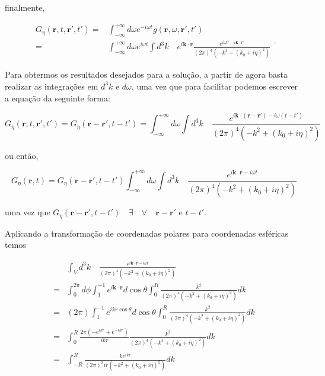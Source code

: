 finalmente,

\begin{equation}
	\begin{split}
	G_{\eta}(\textbf{r},t, \textbf{r}', t') = & 
	\int_{-\infty}^{+\infty} d\omega e^{-i\omega t} g(\textbf{r},\omega, \textbf{r}', t') \\
	= & \int_{-\infty}^{+\infty} d\omega e^{i\omega t} \int d^3k \quad e^{i\textbf{k}\cdot\textbf{r}} \frac{e^{i\omega t'-i\textbf{k}\cdot\textbf{r}'}}{(2\pi)^4\left( -k^2 + (k_0+i\eta)^2\right)}
	\end{split}.
\end{equation}

Para obtermos os resultados desejados para a solução, a partir de agora basta realizar as integrações em $d^3k$ e $d\omega$, uma vez que para facilitar podemos escrever a equação da seguinte forma:

\begin{equation}
	G_{\eta}(\textbf{r},t, \textbf{r}', t') = G_{\eta}(\textbf{r}-\textbf{r}',t-t') = \int_{-\infty}^{+\infty} d\omega \int d^3k \quad  \frac{e^{i\textbf{k}\cdot(\textbf{r}-\textbf{r}')-i\omega (t-t')}}{(2\pi)^4\left( -k^2 + (k_0+i\eta)^2\right)}
\end{equation}

ou então,

\begin{equation}
	G_{\eta}(\textbf{r},t) = G_{\eta}(\textbf{r}-\textbf{r}',t-t') \int_{-\infty}^{+\infty} d\omega \int d^3k \quad  \frac{e^{i\textbf{k}\cdot\textbf{r}-i\omega t}}{(2\pi)^4\left( -k^2 + (k_0+i\eta)^2\right)}
\end{equation}

uma vez que $G_{\eta}(\textbf{r}-\textbf{r}',t-t') \quad \exists \quad \forall \quad \textbf{r}-\textbf{r}' \text{ e } t-t'.$ 

Aplicando a transformação de coordenadas polares para coordenadas esféricas temos

\begin{equation}
	\begin{split}
	& \int_V d^3k \quad  \frac{e^{i\textbf{k}\cdot\textbf{r}-i\omega t}}{(2\pi)^4\left( -k^2 + (k_0+i\eta)^2\right)}\\
	 = &  \int_0^{2\pi}d\phi \int_{1}^{-1} e^{i\textbf{k}\cdot\textbf{r}} d\cos\theta \int_{0}^{R} \frac{k^2}{(2\pi)^4\left( -k^2 + (k_0+i\eta)^2\right)}dk \\
	 = &  (2\pi) \int_{1}^{-1} e^{ikr\cos\theta} d\cos\theta \int_{0}^{R} \frac{k^2}{(2\pi)^4\left( -k^2 + (k_0+i\eta)^2\right)}dk\\
	 = & \int_{0}^{R} \frac{2\pi \left(-e^{ikr}+e^{-ikr}\right)}{ikr} \frac{k^2}{(2\pi)^4\left( -k^2 + (k_0+i\eta)^2\right)}dk\\
	 = & \int_{-R}^{R} \frac{ke^{ikr}}{(2\pi)^3 ir\left( -k^2 + (k_0+i\eta)^2\right)}dk
	\end{split}
\end{equation}

